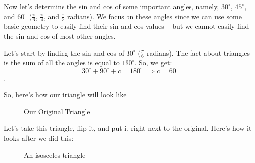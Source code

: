 \label{les_6:part_3_intro_to_trig_functions}

Now let's determine the sin and cos of some important angles, namely,
$30^{\circ}$, $45^{\circ}$, and $60^{\circ}$ ($\frac{\pi}{6}$, $\frac{\pi}{4}$,
and $\frac{\pi}{3}$ radians). We focus on these angles since we can use some
basic geometry to easily find their sin and cos values -- but we cannot easily
find the sin and cos of most other angles.

Let's start by finding the sin and cos of $30^{\circ}$ ($\frac{\pi}{6}$
radians). The fact about triangles is the sum of all the angles is equal to
$180^{\circ}$. So, we get:
\[ 30^{\circ} + 90^{\circ} + c = 180^{\circ} \implies c = 60 \].

So, here's how our triangle will look like:

\begin{figure}[htpb]
  \centering


  \caption{Our Original Triangle}
  \label{fig:30_60_90_triangle}
\end{figure}

Let's take this triangle, flip it, and put it right next to the original. Here's
how it looks after we did this:

\begin{figure}[htpb]
  \centering


  \caption{An isosceles triangle}
  \label{fig:30_deg_triangle_after_transformation}
\end{figure}

